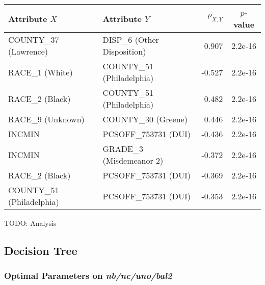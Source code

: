 \documentclass[]{article}
\begin{document}
\begin{tabular}{|l|l|r|c|}
\hline
Attribute $X$ & Attribute $Y$ & $\rho_{X,Y}$ & $p$-value \\
\hline
COUNTY\_37 (Lawrence) & DISP\_6 (Other Disposition) & 0.907 & 2.2e-16 \\
RACE\_1 (White) & COUNTY\_51 (Philadelphia) & -0.527 & 2.2e-16 \\
RACE\_2 (Black) & COUNTY\_51 (Philadelphia) & 0.482 & 2.2e-16 \\
RACE\_9 (Unknown) & COUNTY\_30 (Greene) & 0.446 & 2.2e-16 \\
INCMIN & PCSOFF\_753731 (DUI) & -0.436 & 2.2e-16 \\
INCMIN & GRADE\_3 (Misdemeanor 2) & -0.372 & 2.2e-16 \\
RACE\_2 (Black) & PCSOFF\_753731 (DUI) & -0.369 & 2.2e-16 \\
COUNTY\_51 (Philadelphia) & PCSOFF\_753731 (DUI) & -0.353 & 2.2e-16 \\
\hline
\end{tabular}

TODO: Analysis

\subsection{Decision Tree}
\subsubsection{Optimal Parameters on \emph{nb/nc/uno/bal2}}

%
\end{document}
